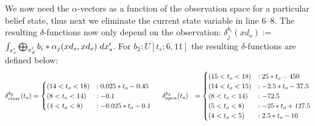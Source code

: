 \documentclass{article} %
\begin{document}
We now need the $\alpha$-vectors as a function of the observation
space for a particular belief state, thus next we eliminate the
current state variable in line 6--8. The resulting $\delta$-functions
now only depend on the observation: $\delta_{j}^{b_i}(xd_o) := $
$\int_{x_s'} \bigoplus_{x_d'} b_i * \alpha_j(xd_s,xd_o) \hspace{1mm}dx_s'$.  For $b_2: U[t_s;6,11]$
the resulting $\delta$-functions are defined below:
{\footnotesize
\begin{align}
\delta_{close}^{b_2}(t_o) &= 
\begin{cases}
 (14 < t_o< 18) &: 0.025*t_o - 0.45\\
 (8 < t_o< 14) &:  - 0.1\\
 (4 < t_o< 8) &: - 0.025*t_o -0.1\\
\end{cases}
\hspace{5mm} 
\delta_{open}^{b_2}(t_o) &= \begin{cases}
 (15 < t_o< 18) &: 25*t_o - 450\\
 (14 < t_o< 15) &: - 2.5*t_o - 37.5\\
 (8 < t_o< 14) &:  -72.5\\
 (5 < t_o< 8) &: - 25*t_o + 127.5\\
 (4 < t_o< 5) &:  2.5*t_o - 10\\
\end{cases}
\nonumber
\end{align}
}
\end{document}
